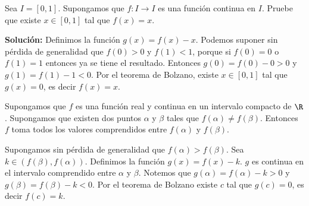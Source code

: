 \begin{example} %
Sea $I=[0,1]$. Supongamos que $f: I \to I$ es una función continua en $I$. %
Pruebe que existe $x \in [0,1]$ tal que $f(x)=x$. %

\begin{center}
\end{center}

\textbf{Solución:} Definimos la función $g(x)=f(x)-x$. %
Podemos suponer sin pérdida de generalidad que $f(0)>0$ y $f(1)<1$, %
porque si $f(0)=0$ o $f(1)=1$ entonces ya se tiene el resultado. %
Entonces $g(0)=f(0)-0>0$ y $g(1)=f(1)-1<0$. %
Por el teorema de Bolzano, existe $x \in [0,1]$ tal que $g(x)=0$, es decir $f(x)=x$. %
\end{example}

\begin{teorema} %
Supongamos que $f$ es una función real y continua en un intervalo compacto de $\R$. %
Supongamos que existen dos puntos $\alpha$ y $\beta$ tales que $f(\alpha) \neq f(\beta)$. %
Entonces $f$ toma todos los valores comprendidos entre $f(\alpha)$ y $f(\beta)$. %
\end{teorema}

\begin{dem}
Supongamos sin pérdida de generalidad que $f(\alpha) > f(\beta)$. %
Sea $k \in (f(\beta), f(\alpha))$. %
Definimos la función $g(x) = f(x) - k$. %
$g$ es continua en el intervalo comprendido entre $\alpha$ y $\beta$. %
Notemos que $g(\alpha) = f(\alpha) - k > 0$ y $g(\beta) = f(\beta) - k < 0$. %
Por el teorema de Bolzano existe $c$ tal que $g(c) = 0$, es decir $f(c) = k$. %
\end{dem}

